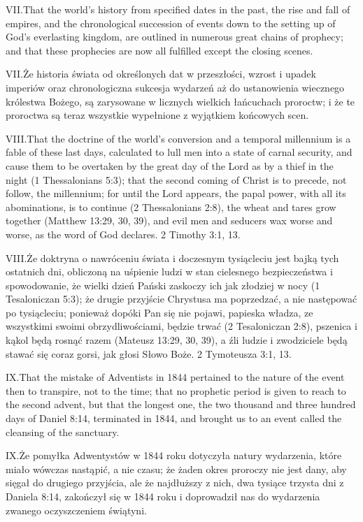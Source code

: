 \lettrine{VII.} That the world’s history from specified dates in the past, the rise and fall of empires, and the chronological succession of events down to the setting up of God’s everlasting kingdom, are outlined in numerous great chains of prophecy; and that these prophecies are now all fulfilled except the closing scenes.


\lettrine{VII.} Że historia świata od określonych dat w przeszłości, wzrost i upadek imperiów oraz chronologiczna sukcesja wydarzeń aż do ustanowienia wiecznego królestwa Bożego, są zarysowane w licznych wielkich łańcuchach proroctw; i że te proroctwa są teraz wszystkie wypełnione z wyjątkiem końcowych scen.


\lettrine{VIII.} That the doctrine of the world’s conversion and a temporal millennium is a fable of these last days, calculated to lull men into a state of carnal security, and cause them to be overtaken by the great day of the Lord as by a thief in the night (1 Thessalonians 5:3); that the second coming of Christ is to precede, not follow, the millennium; for until the Lord appears, the papal power, with all its abominations, is to continue (2 Thessalonians 2:8), the wheat and tares grow together (Matthew 13:29, 30, 39), and evil men and seducers wax worse and worse, as the word of God declares. 2 Timothy 3:1, 13.


\lettrine{VIII.} Że doktryna o nawróceniu świata i doczesnym tysiącleciu jest bajką tych ostatnich dni, obliczoną na uśpienie ludzi w stan cielesnego bezpieczeństwa i spowodowanie, że wielki dzień Pański zaskoczy ich jak złodziej w nocy (1 Tesaloniczan 5:3); że drugie przyjście Chrystusa ma poprzedzać, a nie następować po tysiącleciu; ponieważ dopóki Pan się nie pojawi, papieska władza, ze wszystkimi swoimi obrzydliwościami, będzie trwać (2 Tesaloniczan 2:8), pszenica i kąkol będą rosnąć razem (Mateusz 13:29, 30, 39), a źli ludzie i zwodziciele będą stawać się coraz gorsi, jak głosi Słowo Boże. 2 Tymoteusza 3:1, 13.


\lettrine{IX.} That the mistake of Adventists in 1844 pertained to the nature of the event then to transpire, not to the time; that no prophetic period is given to reach to the second advent, but that the longest one, the two thousand and three hundred days of Daniel 8:14, terminated in 1844, and brought us to an event called the cleansing of the sanctuary.


\lettrine{IX.} Że pomyłka Adwentystów w 1844 roku dotyczyła natury wydarzenia, które miało wówczas nastąpić, a nie czasu; że żaden okres proroczy nie jest dany, aby sięgał do drugiego przyjścia, ale że najdłuższy z nich, dwa tysiące trzysta dni z Daniela 8:14, zakończył się w 1844 roku i doprowadził nas do wydarzenia zwanego oczyszczeniem świątyni.


